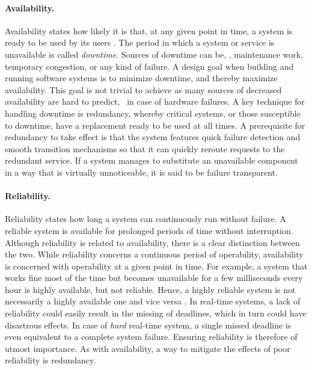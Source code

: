 
\paragraph{Availability.}
Availability states how likely it is that, at any given point in time, a system is ready to be used by its users \cite{tanenbaum2017distributed}. The period in which a system or service is unavailable is called \emph{downtime}. Sources of downtime can be, \eg , maintenance work, temporary congestion, or any kind of failure. A design goal when building and running software systems is to minimize downtime, and thereby maximize availability. This goal is not trivial to achieve as many sources of decreased availability are hard to predict, \eg\ in case of hardware failures. A key technique for handling downtime is redundancy, whereby critical systems, or those susceptible to downtime, have a replacement ready to be used at all times. A prerequisite for redundancy to take effect is that the system features quick failure detection and smooth transition mechanisms so that it can quickly reroute requests to the redundant service. If a system manages to substitute an unavailable component in a way that is virtually unnoticeable, it is said to be failure transparent.

\paragraph{Reliability.}
Reliability states how long a system can continuously run without failure. A reliable system is available for prolonged periods of time without interruption. Although reliability is related to availability, there is a clear distinction between the two. While reliability concerns a continuous period of operability, availability is concerned with operability at a given point in time. For example, a system that works fine most of the time but becomes unavailable for a few milliseconds every hour is highly available, but not reliable. Hence, a highly reliable system is not necessarily a highly available one and vice versa \cite{tanenbaum2017distributed}. In real-time systems, a lack of reliability could easily result in the missing of deadlines, which in turn could have disastrous effects. In case of \emph{hard} real-time system, a single missed deadline is even equivalent to a complete system failure. Ensuring reliability is therefore of utmost importance. As with availability, a way to mitigate the effects of poor reliability is redundancy.

